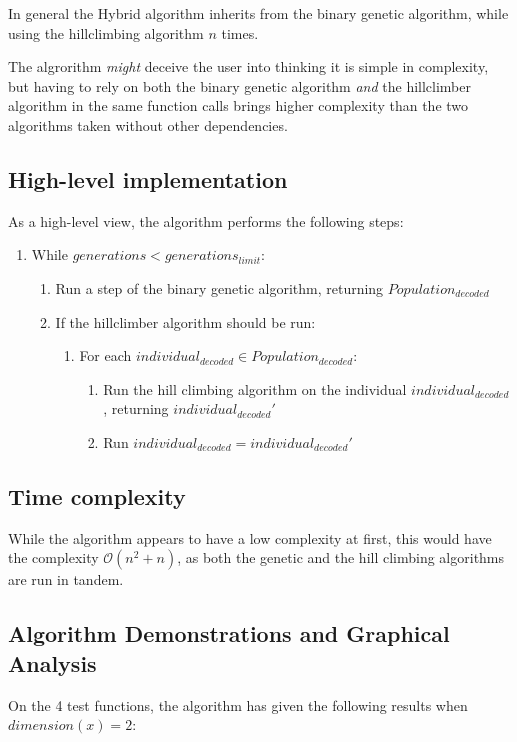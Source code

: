 \documentclass[conference]{IEEEtran}
\begin{document}
In general the Hybrid algorithm inherits from the binary genetic algorithm, while using the hillclimbing algorithm
$n$ times.

The algrorithm \textit{might} deceive the user into thinking it is simple in complexity, but having to rely on both the binary genetic
algorithm \textit{and} the hillclimber algorithm in the same function calls brings higher complexity than the two algorithms
taken without other dependencies.

\subsection{High-level implementation}
As a high-level view, the algorithm performs the following steps:
\begin{enumerate}
    \item While $generations < generations_{limit}$:
    \begin{enumerate}
        \item Run a step of the binary genetic algorithm, returning $Population_{decoded}$
        \item If the hillclimber algorithm should be run:
        \begin{enumerate}
            \item For each $individual_{decoded} \in Population_{decoded}$:
            \begin{enumerate}
                \item Run the hill climbing algorithm on the individual $individual_{decoded}$, returning $individual_{decoded}'$
                \item Run $individual_{decoded} = individual_{decoded}'$
            \end{enumerate}
        \end{enumerate}
    \end{enumerate}
\end{enumerate}

\subsection{Time complexity}
While the algorithm appears to have a low complexity at first, this would have the complexity $\mathcal{O}(n^2 + n)$, as both
the genetic and the hill climbing algorithms are run in tandem.

\subsection{Algorithm Demonstrations and Graphical Analysis}
On the 4 test functions, the algorithm has given the following results when $dimension(x) = 2$:
\end{document}
